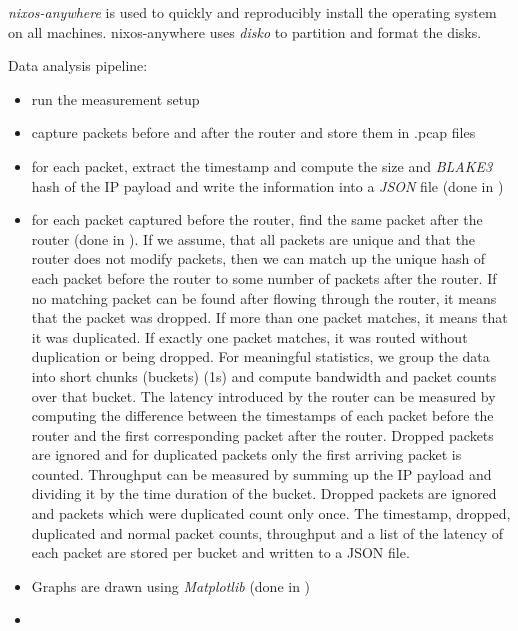 
\textit{nixos-anywhere} \cite{nixos-anywhere} is used to quickly and reproducibly install the operating system on all machines.
nixos-anywhere uses \textit{disko} \cite{disko} to partition and format the disks.



Data analysis pipeline:
\begin{itemize}
  \item run the measurement setup
  \item capture packets before and after the router and store them in .pcap files
  \item for each packet, extract the timestamp and compute the size and \textit{BLAKE3} \cite{wiki:BLAKE3} hash of the IP payload and write the information into a \textit{JSON} \cite{wiki:JSON} file (done in )
  \item for each packet captured before the router, find the same packet after the router (done in ). If we assume, that all packets are unique and that the router does not modify packets, then we can match up the unique hash of each packet before the router to some number of packets after the router. If no matching packet can be found after flowing through the router, it means that the packet was dropped. If more than one packet matches, it means that it was duplicated. If exactly one packet matches, it was routed without duplication or being dropped. For meaningful statistics, we group the data into short chunks (buckets) (1s) and compute bandwidth and packet counts over that bucket. The latency introduced by the router can be measured by computing the difference between the timestamps of each packet before the router and the first corresponding packet after the router. Dropped packets are ignored and for duplicated packets only the first arriving packet is counted. Throughput can be measured by summing up the IP payload  and dividing it by the time duration of the bucket. Dropped packets are ignored and packets which were duplicated count only once. The timestamp, dropped, duplicated and normal packet counts, throughput and a list of the latency of each packet are stored per bucket and written to a JSON file.
  \item Graphs are drawn using \textit{Matplotlib} \cite{Matplotlib} (done in )
  \item {}
\end{itemize}


